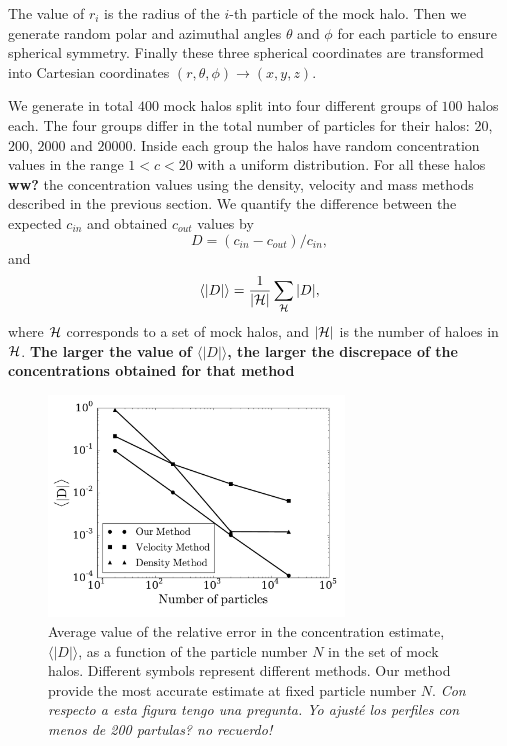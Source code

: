 \documentclass[a4,useAMS,usenatbib,usegraphicx]{mn2e}
\newcommand{\avg}[1]{\langle{#1}\rangle}
\begin{document}
The value of $r_i$ is the radius of the $i$-th particle of the mock
halo.  Then we generate random polar and azimuthal angles $\theta$ and
$\phi$ for each particle to ensure spherical symmetry.  Finally these
three spherical coordinates are transformed into Cartesian coordinates
$(r,\theta,\phi) \rightarrow (x,y,z)$.

We generate in total $400$ mock halos split into four different groups
of $100$ halos each.  The four groups differ in the total number of
particles for their halos: $20$, $200$, $2000$ and $20000$.  Inside
each group the halos have random concentration values in the range
$1<c<20$ with a uniform distribution.  For all these halos {\bf ww?}
the concentration values using the density, velocity and mass methods
described in the previous section.  We quantify the difference between
the expected $c_{in}$ and obtained $c_{out}$ values by
%
\begin{equation}
D=(c_{in}-c_{out})/c_{in},
\label{eq:D}
\end{equation}
%
and
%
\begin{equation}
\avg{|D|}=\frac{1}{\left|{\cal{H}}\right|}\sum_{{\cal{H}}} |D|,
\end{equation}
%
where ${\cal{H}}$ corresponds to a set of mock halos, and
$\left|{\cal{H}}\right|$ is the number of haloes in ${\cal{H}}$. {\bf
  The larger the value of $\avg{|D|}$, the larger the discrepace of
  the concentrations obtained for that method}



\begin{figure}
\begin{center}
  \includegraphics[width=0.70\textwidth]{error.pdf}
\end{center}
\caption{Average value of the relative error in the concentration
  estimate, $\avg{|D|}$, as a function of the particle number $N$ in
  the set of mock halos. Different symbols represent different
  methods. Our method provide the most accurate estimate at fixed
  particle number $N$.  {\it Con respecto a esta figura tengo una
    pregunta. Yo ajusté los perfiles con menos de 200 partulas? no
    recuerdo!}
    \label{fig:error}}
\end{figure}
\end{document}

